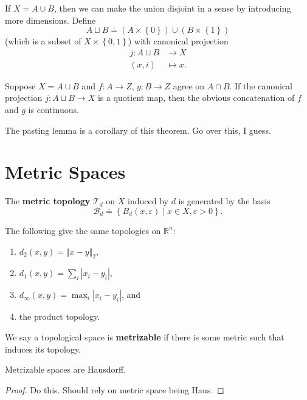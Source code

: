 \documentclass[twoside,10pt]{report}
\begin{document}
If $X = A \cup B$, then we can make the union disjoint in a sense by introducing more dimensions. Define
\[
	A \sqcup B \doteq (A \times \left\{ 0 \right\}) \cup (B \times \left\{ 1 \right\})
\] (which is a subset of $X \times \left\{ 0,1 \right\}$) with canonical projection
\begin{align*}
	j: A \sqcup B &\to X \\
	(x,i)&\mapsto x.
\end{align*}

\begin{thrm}
	Suppose $X = A \cup B$ and $f:A\to Z$, $g:B\to Z$ agree on $A \cap B$. If the canonical projection $j: A \sqcup B \to X$ is a quotient map, then the obvious concatenation of $f$ and $g$ is continuous.
\end{thrm}

The pasting lemma is a corollary of this theorem. {\color{red}Go over this, I guess.}


\section{Metric Spaces}

\begin{defn}[]
The \textbf{metric topology} $\mathcal{T}_{d}$ on $X$ induced by $d$ is generated by the basis
\[
	\mathcal{B}_{d} \doteq \left\{ B_{d}(x,\varepsilon) \;|\; x \in X, \varepsilon>0 \right\}.
\] 
\end{defn}

\begin{prop}
The following give the same topologies on $\mathbb{R}^n$:
\begin{enumerate}
	\item $d_2(x,y) = {\Vert{x-y}\Vert}_{2}$,
	\item $d_1(x,y)=\sum_i |x_i-y_i|$,
	\item $d_{\infty}(x,y) = \max_{i}|x_i-y_i|$, and
	\item the product topology.
\end{enumerate}
\end{prop}

We say a topological space is \textbf{metrizable} if there is some metric such that induces its topology.

\begin{prop}
Metrizable spaces are Hausdorff.
\end{prop}
\begin{proof}
	{\color{red}Do this. Should rely on metric space being Haus.}
\end{proof}
\end{document}
